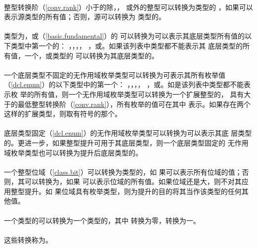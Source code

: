 \paragraph{} %
整型转换阶（\ref{conv.rank}）小于的除，，
或外的整型\prvalue{}可以转换为类型的
\prvalue{}，如果可以表示源类型的所有值；否则，源\prvalue{}可以转换为
类型的\prvalue{}。

\paragraph{} %
类型为，或（\ref{basic.fundamental}）的
\prvalue{}可以转换为可以表示其底层类型所有值的以下类型中第一个的\prvalue{}：
，，，，
，或。如果该列表中类型都不能表示其
底层类型的所有值，一个，或类型的
\prvalue{}可以转换为其底层类型的\prvalue{}。

\paragraph{} %
一个底层类型不固定的无作用域枚举类型\prvalue{}可以转换为可表示其所有枚举值
（\ref{dcl.enum}）的以下类型中的第一个：
，，，，
，或。如是该列表中类型都不能表示枚
举的所有值，则一个无作用域枚举类型\prvalue{}可以转换为一个扩展整型的\prvalue{}，
具有大于的最低整型转换阶（\ref{conv.rank}），所有枚举的值可在其中
表示。如果存在两个这样的扩展类型，则取有符号的那个。

\paragraph{} %
底层类型固定（\ref{dcl.enum}）的无作用域枚举类型\prvalue{}可以转换为可以表示其底
层类型的\prvalue{}。更进一步，如果整型提升可用于其底层类型，则一个底层类型固定的
无作用域枚举类型\prvalue{}也可以转换为提升后底层类型的\prvalue{}。

\paragraph{} %
一个整型位域（\ref{class.bit}）\prvalue{}可以转换为类型的\prvalue{}，如
果可以表示所有位域的值；否则，其可以转换为，如果
可以表示位域的所有值。如果位域还是大，则不对其应用整型提升。如
果位域具有枚举类型，则为提升的目的将其当作该类型的任何其他值。

\paragraph{} %
一个类型的\prvalue{}可以转换为一个类型的\prvalue{}，其中
转换为零，转换为一。

\paragraph{} %
这些转换称为。
